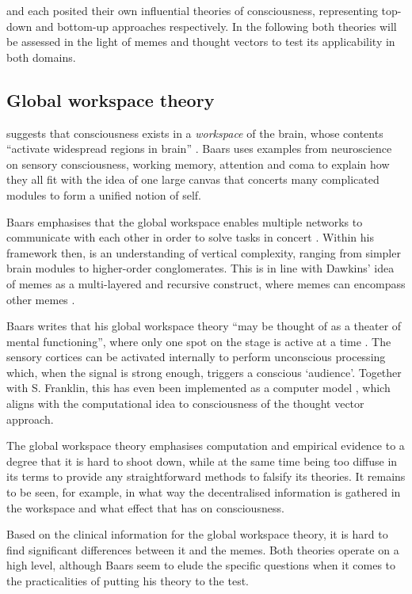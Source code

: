 \documentclass[a4paper,oneside]{memoir}
\begin{document}
\textcite{baars2005} and \textcite{Tononi2004} each posited their own influential theories of
consciousness, representing top-down and bottom-up approaches respectively.
In the following both theories will be assessed in the light of memes and thought
vectors to test its applicability in both domains.

\subsection{Global workspace theory}
\textcite{baars2005} suggests that consciousness exists in a \textit{workspace} of the
brain, whose contents ``activate widespread regions in brain'' \autocite[p.52]{baars2005}.
Baars uses examples from neuroscience on sensory consciousness, working memory, attention
and coma to explain how they all fit with the idea of one large canvas that concerts
many complicated modules to form a unified notion of self.

Baars emphasises that the global workspace enables multiple networks to communicate
with each other in order to solve tasks in concert \autocite{baars2005}. Within his
framework then, is an understanding of vertical complexity, ranging from simpler brain
modules to higher-order conglomerates. This is in line with Dawkins' idea of memes as
a multi-layered and recursive construct, where memes can encompass other memes
\autocite{dennett2017}.

Baars writes that his global workspace theory ``may be thought of as a theater
of mental functioning'', where only one spot on the stage is active at a time
\autocite[p. 46]{baars2005}. The sensory cortices can be activated internally
to perform unconscious processing which, when the signal is strong enough,
triggers a conscious `audience'. Together with S. Franklin, this has even
been implemented as a computer model \autocite{baars2005}, which aligns with 
the computational idea to consciousness of the thought vector approach. 

The global workspace theory emphasises computation and empirical evidence to 
a degree that it is hard to shoot down, while at the same time being too diffuse
in its terms to provide any straightforward methods to falsify its theories.
It remains to be seen, for example, in what way the decentralised information is
gathered in the workspace and what effect that has on consciousness.

Based on the clinical information for the global workspace theory, it is hard
to find significant differences between it and the memes. Both theories operate
on a high level, although Baars seem to elude the specific questions when
it comes to the practicalities of putting his theory to the test.
\end{document}
